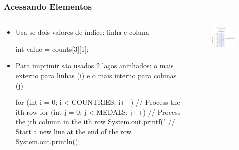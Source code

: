 \documentclass[xcolor={dvipsnames,table},aspectratio=169]{beamer}
\begin{document}
\begin{frame}[fragile]\frametitle{Acessando Elementos}
\begin{columns}[T]
	\begin{column}{0.6\linewidth}
\begin{itemize}
	\item Usa-se dois valores de índice: linha e coluna
{\scriptsize
\begin{javacode}
int value = counts[3][1];
\end{javacode}
}
	\item Para imprimir são usados 2 laços aninhados: o mais externo para linhas (i) e o mais interno para colunas (j)
{\scriptsize
\begin{javacode}
for (int i = 0; i < COUNTRIES; i++) {
   // Process the ith row
   for (int j = 0; j < MEDALS; j++) {
      // Process the jth column in the ith row
      System.out.printf("%
   }
   // Start a new line at the end of the row
   System.out.println();
}
\end{javacode}
}
\end{itemize}
	\end{column}
	\begin{column}{0.4\linewidth}
\begin{figure}[h]
	\includegraphics[height=0.5\paperheight,center]{pucrs-ep-fprog-unidade_06-arrays-laminas-array_2d_acessando_elementos.png}
\end{figure}
	\end{column}
\end{columns}
\end{frame}
\end{document}
